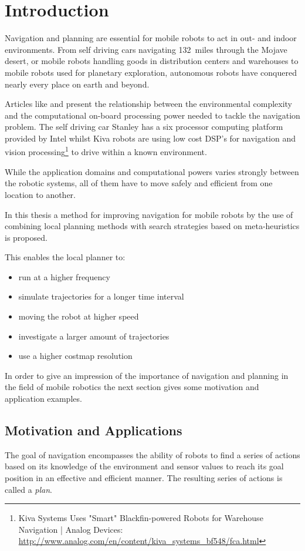 \chapter{Introduction}\label{ch:introduction}
Navigation and planning are essential for mobile robots to act in out- and indoor environments. 
From self driving cars navigating 132~miles through the Mojave desert, or mobile robots handling goods in distribution centers and warehouses to mobile robots used for planetary exploration, autonomous robots have conquered nearly every place on earth and beyond.
 
Articles like \cite{stanley} and \cite{kiva} present the relationship between the environmental complexity and the computational on-board processing power needed to tackle the navigation problem.
The self driving car Stanley has a six processor computing platform provided by Intel whilst Kiva robots are using low cost DSP's for navigation and vision processing\footnote{Kiva Systems Uses "Smart" Blackfin-powered Robots for Warehouse Navigation | Analog Devices: \url{http://www.analog.com/en/content/kiva_systems_bf548/fca.html}} to drive within a known environment.  

While the application domains and computational powers varies strongly between the robotic systems, all of them have to move safely and efficient from one location to another.   

In this thesis a method for improving navigation for mobile robots by the use of combining local planning methods with search strategies based on meta-heuristics is proposed.

This enables the local planner to:
\begin{itemize}
\item run at a higher frequency
\item simulate trajectories for a longer time interval
\item moving the robot at higher speed
\item investigate a larger amount of trajectories
\item use a higher costmap resolution
\end{itemize}

In order to give an impression of the importance of navigation and planning in the field of mobile robotics the next section gives some motivation and application examples.

\section{Motivation and Applications}\label{sec:motivation} 
The goal of navigation encompasses the ability of robots to find a series of actions based on its knowledge of the environment and sensor values to reach its goal position in an effective and efficient manner.
The resulting series of actions is called a \emph{plan}. 

